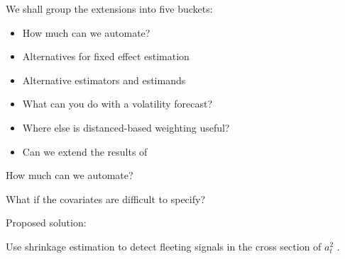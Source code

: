 \documentclass[9pt]{beamer}
\theoremstyle{definition}
\begin{document}
\begin{frame}
We shall group the extensions into five buckets:
\begin{itemize}
    \item How much can we automate?
    \item Alternatives for fixed effect estimation
    \item Alternative estimators and estimands
    \item What can you do with a volatility forecast?
    \item Where else is distanced-based weighting useful?
    \item Can we extend the results of \parencite[][]{bodilsen2023exploiting}
\end{itemize}
\end{frame}


\begin{frame}{How much can we automate?}

    What if the covariates are difficult to specify?

    \bigbreak
    Proposed solution:

    \bigbreak

    Use shrinkage estimation to detect fleeting signals in the cross section of $a_{t}^{2}$ \parencite[][]{chinco2019sparse}. 
\end{frame}





        
        
        
\end{document}

